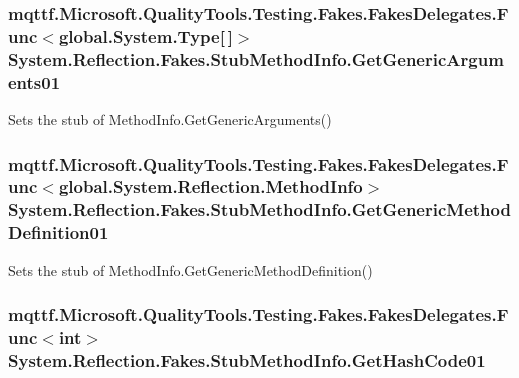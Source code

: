 \hypertarget{class_system_1_1_reflection_1_1_fakes_1_1_stub_method_info_a6274320a30c47d4e216425231f2afd9a}{
\subsubsection[{Get\-Generic\-Arguments01}]{\setlength{\rightskip}{0pt plus 5cm}mqttf.\-Microsoft.\-Quality\-Tools.\-Testing.\-Fakes.\-Fakes\-Delegates.\-Func$<$global.\-System.\-Type\mbox{[}$\,$\mbox{]}$>$ System.\-Reflection.\-Fakes.\-Stub\-Method\-Info.\-Get\-Generic\-Arguments01}}\label{class_system_1_1_reflection_1_1_fakes_1_1_stub_method_info_a6274320a30c47d4e216425231f2afd9a}


Sets the stub of Method\-Info.\-Get\-Generic\-Arguments()

\hypertarget{class_system_1_1_reflection_1_1_fakes_1_1_stub_method_info_a2c0c76a2e7ef1925ac5c56bf10a12ea0}{
\subsubsection[{Get\-Generic\-Method\-Definition01}]{\setlength{\rightskip}{0pt plus 5cm}mqttf.\-Microsoft.\-Quality\-Tools.\-Testing.\-Fakes.\-Fakes\-Delegates.\-Func$<$global.\-System.\-Reflection.\-Method\-Info$>$ System.\-Reflection.\-Fakes.\-Stub\-Method\-Info.\-Get\-Generic\-Method\-Definition01}}\label{class_system_1_1_reflection_1_1_fakes_1_1_stub_method_info_a2c0c76a2e7ef1925ac5c56bf10a12ea0}


Sets the stub of Method\-Info.\-Get\-Generic\-Method\-Definition()

\hypertarget{class_system_1_1_reflection_1_1_fakes_1_1_stub_method_info_ac1d35bf1a0a558a6a5023c8cd7850f1e}{
\subsubsection[{Get\-Hash\-Code01}]{\setlength{\rightskip}{0pt plus 5cm}mqttf.\-Microsoft.\-Quality\-Tools.\-Testing.\-Fakes.\-Fakes\-Delegates.\-Func$<$int$>$ System.\-Reflection.\-Fakes.\-Stub\-Method\-Info.\-Get\-Hash\-Code01}}\label{class_system_1_1_reflection_1_1_fakes_1_1_stub_method_info_ac1d35bf1a0a558a6a5023c8cd7850f1e}


